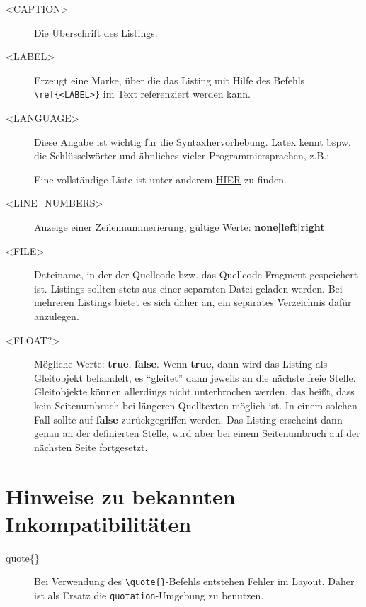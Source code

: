 \begin{description}
	\item[<CAPTION>] Die Überschrift des Listings.
	\item[<LABEL>] Erzeugt eine Marke, über die das Listing mit Hilfe des
	Befehls \verb|\ref{<LABEL>}| im Text referenziert werden kann.
	\item[<LANGUAGE>] Diese Angabe ist wichtig für die Syntaxhervorhebung. Latex kennt bspw. die Schlüsselwörter und ähnliches vieler Programmiersprachen, z.B.:
		Eine vollständige Liste ist unter anderem \href{http://en.wikibooks.org/wiki/LaTeX/Packages/Listings}{HIER} zu finden.
	\item[<LINE\_NUMBERS>] Anzeige einer Zeilennummerierung, gültige Werte: {\bf none|left|right}
	\item[<FILE>] Dateiname, in der der Quellcode bzw. das Quellcode-Fragment gespeichert ist. Listings sollten stets aus einer separaten Datei geladen werden. Bei mehreren Listings bietet es sich daher an, ein separates Verzeichnis dafür anzulegen.
	\item[<FLOAT?>] Mögliche Werte: \textbf{true}, \textbf{false}. Wenn \textbf{true}, dann wird das Listing als Gleitobjekt behandelt, es "`gleitet"' dann jeweils an die nächste freie Stelle. Gleitobjekte können allerdings nicht unterbrochen werden, das heißt, dass kein Seitenumbruch bei längeren Quelltexten möglich ist. In einem solchen Fall sollte auf \textbf{false} zurückgegriffen werden. Das Listing erscheint dann genau an der definierten Stelle, wird aber bei einem Seitenumbruch auf der nächsten Seite fortgesetzt.
\end{description}

\section{Hinweise zu bekannten Inkompatibilitäten}
\label{sec:Inkompatibilitäten}

\begin{description}
  \item[quote\{\}] Bei Verwendung des
  \verb|\quote{}|-Befehls entstehen Fehler im Layout. Daher ist als Ersatz die \verb|quotation|-Umgebung zu benutzen.
\end{description}

